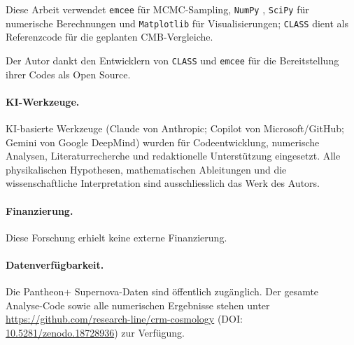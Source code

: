 \documentclass[aps,prd,twocolumn,superscriptaddress,nofootinbib]{revtex4-2}
\begin{document}
Diese Arbeit verwendet \texttt{emcee} \cite{ForemanMackey2013} für MCMC-Sampling, \texttt{NumPy} \cite{Harris2020}, \texttt{SciPy} \cite{Virtanen2020} für numerische Berechnungen und \texttt{Matplotlib} \cite{Hunter2007} für Visualisierungen; \texttt{CLASS} \cite{Blas2011} dient als Referenzcode für die geplanten CMB-Vergleiche.

\begin{acknowledgments}
Der Autor dankt den Entwicklern von \texttt{CLASS} \cite{Blas2011} und
\texttt{emcee} \cite{ForemanMackey2013} für die Bereitstellung ihrer Codes
als Open Source.

\paragraph{KI-Werkzeuge.}
KI-basierte Werkzeuge (Claude von Anthropic; Copilot von Microsoft/GitHub; Gemini von Google DeepMind)
wurden für Codeentwicklung, numerische Analysen, Literaturrecherche und redaktionelle
Unterstützung eingesetzt. Alle physikalischen Hypothesen, mathematischen Ableitungen und die wissenschaftliche
Interpretation sind ausschliesslich das Werk des Autors.
\end{acknowledgments}

\paragraph{Finanzierung.}
Diese Forschung erhielt keine externe Finanzierung.

\paragraph{Datenverfügbarkeit.}
Die Pantheon+ Supernova-Daten \cite{Scolnic2022} sind öffentlich zugänglich.
Der gesamte Analyse-Code sowie alle numerischen Ergebnisse stehen unter
\url{https://github.com/research-line/crm-cosmology}
(DOI: \href{https://doi.org/10.5281/zenodo.18728936}{10.5281/zenodo.18728936}) zur Verfügung.
\end{document}
